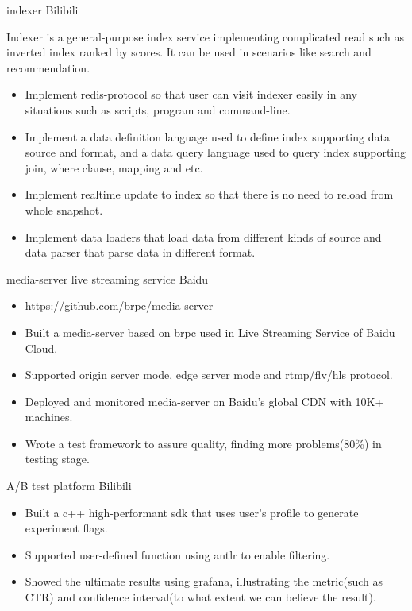\documentclass[11pt,a4paper]{moderncv}
\begin{document}
{indexer}
{Bilibili}
{}
{}
{
Indexer is a general-purpose index service implementing complicated read such as inverted index ranked by scores. It can be used in scenarios like search and recommendation.
\begin{itemize}
    \item Implement redis-protocol so that user can visit indexer easily in any situations such as scripts, program and command-line.
    \item Implement a data definition language used to define index supporting data source and format, and a data query language used to query index supporting join, where clause, mapping and etc.
    \item Implement realtime update to index so that there is no need to reload from whole snapshot.
    \item Implement data loaders that load data from different kinds of source and data parser that parse data in different format.
\end{itemize}
}


{media-server}
{live streaming service}
{Baidu}
{}
{
\begin{itemize}
    \item \url{https://github.com/brpc/media-server}
    \item Built a media-server based on brpc used in Live Streaming Service of Baidu Cloud.
    \item Supported origin server mode, edge server mode and rtmp/flv/hls protocol.
    \item Deployed and monitored media-server on Baidu's global CDN with 10K+ machines.
    \item Wrote a test framework to assure quality, finding more problems(80\%) in testing stage.
\end{itemize}
}

{A/B test platform}
{Bilibili}
{}
{}
{
\begin{itemize}
    \item Built a c++ high-performant sdk that uses user's profile to generate experiment flags.
    \item Supported user-defined function using antlr to enable filtering.
    \item Showed the ultimate results using grafana, illustrating the metric(such as CTR) and confidence interval(to what extent we can believe the result).
\end{itemize}
}
\end{document}
